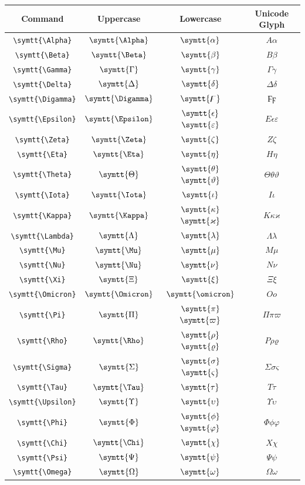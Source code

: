 \documentclass[12pt,a4paper]{article}
\begin{document}
\begin{longtable}{|c|c|c|c|}
\hline
\textbf{Command} & \textbf{Uppercase} & \textbf{Lowercase} & \textbf{Unicode Glyph} \\
\hline
\verb|\symtt{\Alpha}| & $\symtt{\Alpha}$ & $\symtt{\alpha}$ & $ Α 𝛼 $ \\
\verb|\symtt{\Beta}| & $\symtt{\Beta}$ & $\symtt{\beta}$ & $ Β 𝛽 $ \\
\verb|\symtt{\Gamma}| & $\symtt{\Gamma}$ & $\symtt{\gamma}$ & $ Γ 𝛾 $ \\
\verb|\symtt{\Delta}| & $\symtt{\Delta}$ & $\symtt{\delta}$ & $ Δ 𝛿 $ \\
\verb|\symtt{\Digamma}| & $\symtt{\Digamma}$ & $\symtt{\digamma}$ & $ Ϝ ϝ $ \\
\verb|\symtt{\Epsilon}| & $\symtt{\Epsilon}$ & $\symtt{\epsilon}$ $\symtt{\varepsilon}$ & $ Ε 𝜖 𝜀 $ \\
\verb|\symtt{\Zeta}| & $\symtt{\Zeta}$ & $\symtt{\zeta}$ & $ Ζ 𝜁 $ \\
\verb|\symtt{\Eta}| & $\symtt{\Eta}$ & $\symtt{\eta}$ & $ Η 𝜂 $ \\
\verb|\symtt{\Theta}| & $\symtt{\Theta}$ & $\symtt{\theta}$ $\symtt{\vartheta}$ & $ Θ 𝜃 𝜗 $ \\
\verb|\symtt{\Iota}| & $\symtt{\Iota}$ & $\symtt{\iota}$ & $ Ι 𝜄 $ \\
\verb|\symtt{\Kappa}| & $\symtt{\Kappa}$ & $\symtt{\kappa}$ $\symtt{\varkappa}$ & $ Κ 𝜅 𝜘 $ \\
\verb|\symtt{\Lambda}| & $\symtt{\Lambda}$ & $\symtt{\lambda}$ & $ Λ 𝜆 $ \\
\verb|\symtt{\Mu}| & $\symtt{\Mu}$ & $\symtt{\mu}$ & $ Μ 𝜇 $ \\
\verb|\symtt{\Nu}| & $\symtt{\Nu}$ & $\symtt{\nu}$ & $ Ν 𝜈 $ \\
\verb|\symtt{\Xi}| & $\symtt{\Xi}$ & $\symtt{\xi}$ & $ Ξ 𝜉 $ \\
\verb|\symtt{\Omicron}| & $\symtt{\Omicron}$ & $\symtt{\omicron}$ & $ Ο 𝜊 $ \\
\verb|\symtt{\Pi}| & $\symtt{\Pi}$ & $\symtt{\pi}$ $\symtt{\varpi}$ & $ Π 𝜋 𝜛 $ \\
\verb|\symtt{\Rho}| & $\symtt{\Rho}$ & $\symtt{\rho}$ $\symtt{\varrho}$ & $ Ρ 𝜌 𝜚 $ \\
\verb|\symtt{\Sigma}| & $\symtt{\Sigma}$ & $\symtt{\sigma}$ $\symtt{\varsigma}$ & $ Σ 𝜎 𝜍 $ \\
\verb|\symtt{\Tau}| & $\symtt{\Tau}$ & $\symtt{\tau}$ & $ Τ 𝜏 $ \\
\verb|\symtt{\Upsilon}| & $\symtt{\Upsilon}$ & $\symtt{\upsilon}$ & $ Υ 𝜐 $ \\
\verb|\symtt{\Phi}| & $\symtt{\Phi}$ & $\symtt{\phi}$ $\symtt{\varphi}$ & $ Φ 𝜙 𝜑 $ \\
\verb|\symtt{\Chi}| & $\symtt{\Chi}$ & $\symtt{\chi}$ & $ Χ 𝜒 $ \\
\verb|\symtt{\Psi}| & $\symtt{\Psi}$ & $\symtt{\psi}$ & $ Ψ 𝜓 $ \\
\verb|\symtt{\Omega}| & $\symtt{\Omega}$ & $\symtt{\omega}$ & $ Ω 𝜔 $ \\
\hline
\end{longtable}
\newpage
\end{document}
